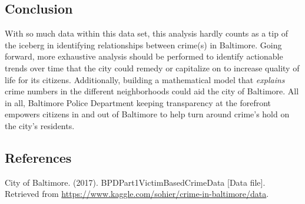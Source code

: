\documentclass{article}
\newlength\tindent
\renewcommand{\indent}{\hspace*{\tindent}}
\begin{document}
\subsection*{Conclusion}
\indent With so much data within this data set, this analysis hardly counts as a tip of the iceberg in identifying relationships between crime(s) in Baltimore.  Going forward, more exhaustive analysis should be performed to identify actionable trends over time that the city could remedy or capitalize on to increase quality of life for its citizens.  Additionally, building a mathematical model that \textit{explains} crime numbers in the different neighborhoods could aid the city of Baltimore.  All in all, Baltimore Police Department keeping transparency at the forefront empowers citizens in and out of Baltimore to help turn around crime's hold on the city's residents.  

\newpage

\subsection*{References}
City of Baltimore. (2017). BPDPart1VictimBasedCrimeData [Data file].  Retrieved from \url{https://www.kaggle.com/sohier/crime-in-baltimore/data}.  


\end{document}
